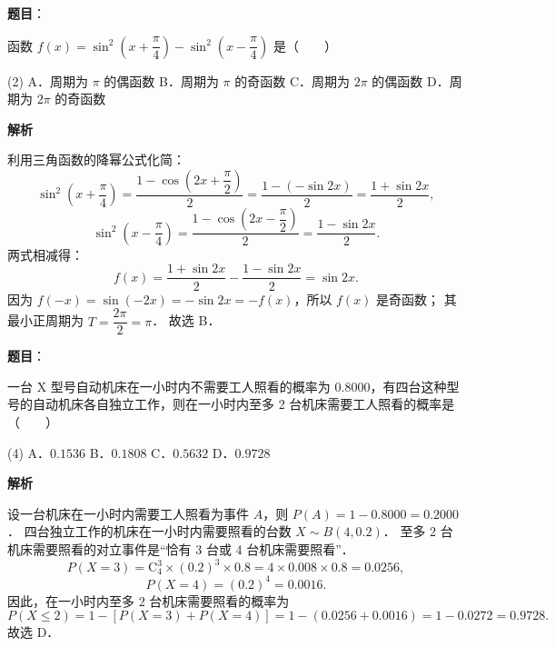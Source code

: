 \begin{answer}

\textbf{题目}：

函数 $f(x) = \sin^2\left(x + \dfrac{\pi}{4}\right) - \sin^2\left(x - \dfrac{\pi}{4}\right)$ 是\mbox{（　　）}

\begin{gkopts}(2)
\task A．周期为 $\pi$ 的偶函数
\task B．周期为 $\pi$ 的奇函数
\task C．周期为 $2\pi$ 的偶函数
\task D．周期为 $2\pi$ 的奇函数
\end{gkopts}

\textbf{解析}

利用三角函数的降幂公式化简：
\nopagebreak[4]
\[
\sin^2\left(x + \dfrac{\pi}{4}\right) = \dfrac{1 - \cos\left(2x + \dfrac{\pi}{2}\right)}{2} = \dfrac{1 - (-\sin 2x)}{2} = \dfrac{1 + \sin 2x}{2},
\]
\nopagebreak[4]
\[
\sin^2\left(x - \dfrac{\pi}{4}\right) = \dfrac{1 - \cos\left(2x - \dfrac{\pi}{2}\right)}{2} = \dfrac{1 - \sin 2x}{2}.
\]
两式相减得：
\nopagebreak[4]
\[
f(x) = \dfrac{1 + \sin 2x}{2} - \dfrac{1 - \sin 2x}{2} = \sin 2x.
\]
因为 $f(-x) = \sin(-2x) = -\sin 2x = -f(x)$，所以 $f(x)$ 是奇函数；
其最小正周期为 $T = \dfrac{2\pi}{2} = \pi$．
故选 B．


\end{answer}
\begin{answer}

\textbf{题目}：

一台 X 型号自动机床在一小时内不需要工人照看的概率为 $0.8000$，有四台这种型号的自动机床各自独立工作，则在一小时内至多 2 台机床需要工人照看的概率是\mbox{（　　）}

\begin{gkopts}(4)
\task A．$0.1536$
\task B．$0.1808$
\task C．$0.5632$
\task D．$0.9728$
\end{gkopts}

\textbf{解析}

设一台机床在一小时内需要工人照看为事件 $A$，则 $P(A) = 1 - 0.8000 = 0.2000$．
四台独立工作的机床在一小时内需要照看的台数 $X \sim B(4, 0.2)$．
至多 2 台机床需要照看的对立事件是“恰有 3 台或 4 台机床需要照看”．
\nopagebreak[4]
\[
P(X = 3) = \mathrm{C}_4^3 \times (0.2)^3 \times 0.8 = 4 \times 0.008 \times 0.8 = 0.0256,
\]
\nopagebreak[4]
\[
P(X = 4) = (0.2)^4 = 0.0016.
\]
因此，在一小时内至多 2 台机床需要照看的概率为
\nopagebreak[4]
\[
P(X \leqslant 2) = 1 - [P(X = 3) + P(X = 4)] = 1 - (0.0256 + 0.0016) = 1 - 0.0272 = 0.9728.
\]
故选 D．


\end{answer}
